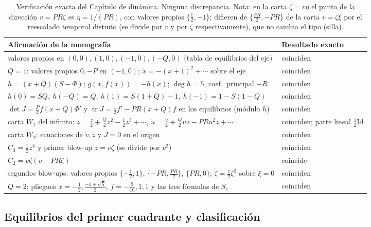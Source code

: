 \documentclass[11pt,a4paper]{article}
\newcommand{\tr}{\operatorname{tr}}
\theoremstyle{plain}
\theoremstyle{definition}
\theoremstyle{remark}
\begin{document}
\begin{table}[ht]
\centering
\small
\begin{tabular}{@{}p{9.2cm} p{5.4cm}@{}}
\toprule
Afirmación de la monografía & Resultado exacto \\
\midrule
valores propios en $(0,0),(1,0),(-1,0),(-Q,0)$ (tabla de equilibrios del eje) & coinciden \\
$Q=1$: valores propios $0,-P$ en $(-1,0)$; $\dot x=-(x+1)^2+\cdots$ sobre el eje & coinciden \\
$h=(x+Q)(S-\Phi)$; $g(x,f(x))=-h(x)$; $\deg h=5$, coef.\ principal $-R$ & coinciden \\
$h(0)=SQ,\ h(-Q)=Q,\ h(1)=S(1+Q)-1,\ h(-1)=1-S(1-Q)$ & coinciden \\
$\det J=\tfrac P2f(x+Q)\Phi'$ y $\tr J=\tfrac12f'-PR(x+Q)f$ en los equilibrios (módulo $h$) & coinciden \\
carta $W_1$ del infinito: $\dot z=\tfrac z2+\tfrac Q2z^2-\tfrac12z^3+\cdots$, $\dot u=\tfrac u2+\tfrac Q2uz-PRu^2z+\cdots$ & coinciden; parte lineal $\tfrac12\mathrm{Id}$ \\
carta $W_2$: ecuaciones de $\dot v,\dot z$ y $J=0$ en el origen & coinciden \\
$C_3=\tfrac12z^4$ y primer blow-up $z=v\zeta$ (se divide por $v^2$) & coinciden \\
$C_2=v\zeta(v-PR\zeta)$ & coincide \\
segundos blow-ups: valores propios $\{-\tfrac12,1\}$, $\{-PR,\tfrac{PR}2\}$, $\{PR,0\}$; $\dot\zeta=\tfrac12\zeta^3$ sobre $\xi=0$ & coinciden \\
$Q=2$: pliegues $x=-\tfrac12,\tfrac{-1\pm\sqrt5}2$, $f=-\tfrac9{16},1,1$ y las tres fórmulas de $S_c$ & coinciden \\
\bottomrule
\end{tabular}
\caption{Verificación exacta del Capítulo de dinámica. Ninguna discrepancia. Nota: en la carta $\zeta=v\eta$ el punto de la dirección $v=PR\zeta$ es $\eta=1/(PR)$, con valores propios $\{\tfrac12,-1\}$; difieren de $\{\tfrac{PR}2,-PR\}$ de la carta $v=\zeta\xi$ por el reescalado temporal distinto (se divide por $v$ y por $\zeta$ respectivamente), que no cambia el tipo (silla).}
\end{table}

\subsection{Equilibrios del primer cuadrante y clasificación}\label{sec:equilibrios}
\end{document}
